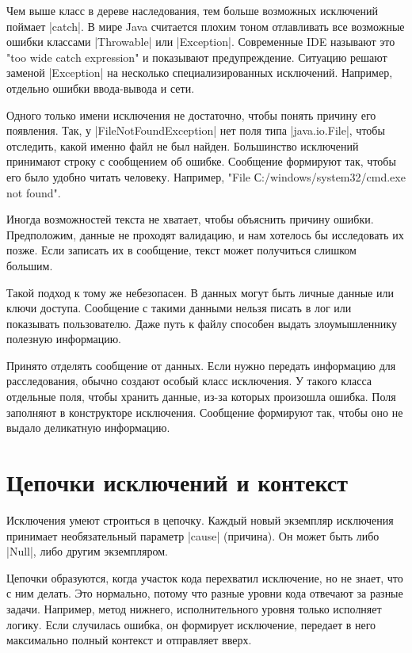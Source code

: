 Чем выше класс в дереве наследования, тем больше возможных исключений поймает
\spverb|catch|. В мире Java считается плохим тоном отлавливать все возможные ошибки
классами \spverb|Throwable| или \spverb|Exception|. Современные IDE называют это "too wide
catch expression" и показывают предупреждение. Ситуацию решают заменой
\spverb|Exception| на несколько специализированных исключений. Например, отдельно
ошибки ввода-вывода и сети.

Одного только имени исключения не достаточно, чтобы понять причину его
появления. Так, у \spverb|FileNotFoundException| нет поля типа \spverb|java.io.File|, чтобы
отследить, какой именно файл не был найден. Большинство исключений принимают
строку с сообщением об ошибке. Сообщение формируют так, чтобы его было удобно
читать человеку. Например, "File С:/windows/system32/cmd.exe not found".

Иногда возможностей текста не хватает, чтобы объяснить причину
ошибки. Предположим, данные не проходят валидацию, и нам хотелось бы исследовать
их позже. Если записать их в сообщение, текст может получиться слишком большим.

Такой подход к тому же небезопасен. В данных могут быть личные данные или ключи
доступа. Сообщение с такими данными нельзя писать в лог или показывать
пользователю. Даже путь к файлу способен выдать злоумышленнику полезную
информацию.

Принято отделять сообщение от данных. Если нужно передать информацию для
расследования, обычно создают особый класс исключения. У такого класса отдельные
поля, чтобы хранить данные, из-за которых произошла ошибка. Поля заполняют в
конструкторе исключения. Сообщение формируют так, чтобы оно не выдало деликатную
информацию.

\section{Цепочки исключений и контекст}

Исключения умеют строиться в цепочку. Каждый новый экземпляр исключения
принимает необязательный параметр \spverb|cause| (причина). Он может быть либо \spverb|Null|,
либо другим экземпляром.

Цепочки образуются, когда участок кода перехватил исключение, но не знает, что с
ним делать. Это нормально, потому что разные уровни кода отвечают за разные
задачи. Например, метод нижнего, исполнительного уровня только исполняет логику.
Если случилась ошибка, он формирует исключение, передает в него максимально
полный контекст и отправляет вверх.

